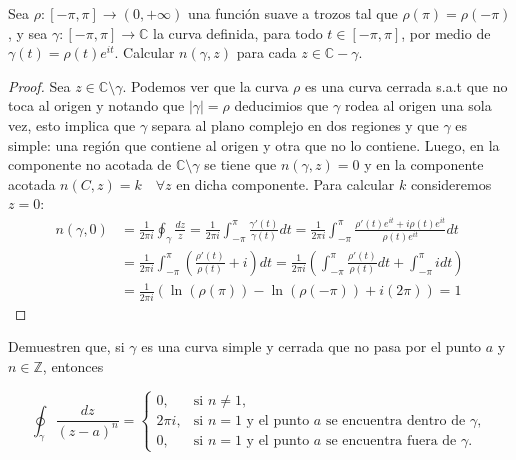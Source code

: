 \documentclass{article}
\newcommand{\C}{\mathbb{C}}
\newenvironment{theorem}[2][Ejercicio]{\begin{trivlist}
\item[\hskip\labelsep{\bfseries #1}\hskip\labelsep{\bfseries #2.}]}{\end{trivlist}}
\begin{document}
\vspace{0.25in}

\begin{theorem}{3}
    Sea \( \rho : [-\pi, \pi] \to (0, +\infty) \) una función suave a trozos tal que \( \rho(\pi) = \rho(-\pi) \), y sea
    \( \gamma : [-\pi, \pi] \to \mathbb{C} \) la curva definida, para todo \( t \in [-\pi, \pi] \), por medio de
    \( \gamma(t) = \rho(t)e^{it} \). Calcular \( n(\gamma, z) \) para cada \( z \in \mathbb{C} - \gamma \).
\end{theorem}

\begin{proof}
    Sea \( z \in \C \setminus \gamma \). Podemos ver que la curva \( \rho \) es una curva cerrada s.a.t que no toca al origen y notando que \( |\gamma| = \rho \) deducimios que \( \gamma \) rodea al origen una sola vez, esto implica que \( \gamma \)
    separa al plano complejo en dos regiones y que \( \gamma \) es simple: una región que contiene al origen y otra que no lo contiene. Luego, en la componente no acotada de \( \C \setminus \gamma \) se tiene que \( n(\gamma, z) = 0 \) y en la componente acotada
    \( n(C, z) = k \quad \forall z \) en dicha componente. Para calcular \( k \) consideremos \( z = 0 \):\begin{align*}
        n(\gamma, 0) & = \frac{1}{2\pi i} \oint_{\gamma} \frac{dz}{z} = \frac{1}{2\pi i} \int_{-\pi}^{\pi} \frac{\gamma'(t)}{\gamma(t)} dt = \frac{1}{2\pi i} \int_{-\pi}^{\pi} \frac{\rho'(t)e^{it} + i\rho(t)e^{it}}{\rho(t)e^{it}} dt \\
                     & = \frac{1}{2\pi i} \int_{-\pi}^{\pi} \left( \frac{\rho'(t)}{\rho(t)} + i \right) dt = \frac{1}{2\pi i} \left( \int_{-\pi}^{\pi} \frac{\rho'(t)}{\rho(t)} dt + \int_{-\pi}^{\pi} i dt \right)                      \\
                     & = \frac{1}{2\pi i} \left( \ln(\rho(\pi)) - \ln(\rho(-\pi)) + i(2\pi) \right) = 1
    \end{align*}
\end{proof}

\vspace{0.25in}

\begin{theorem}{4}
    Demuestren que, si \( \gamma \) es una curva simple y cerrada que no pasa por el punto \( a \) y
    \( n \in \mathbb{Z} \), entonces

    \[
        \oint_{\gamma} \frac{dz}{{(z - a)}^n} =
        \begin{cases}
            0,      & \text{si } n \neq 1,                                                           \\
            2\pi i, & \text{si } n = 1 \text{ y el punto } a \text{ se encuentra dentro de } \gamma, \\
            0,      & \text{si } n = 1 \text{ y el punto } a \text{ se encuentra fuera de } \gamma.
        \end{cases}
    \]
\end{theorem}
\end{document}
